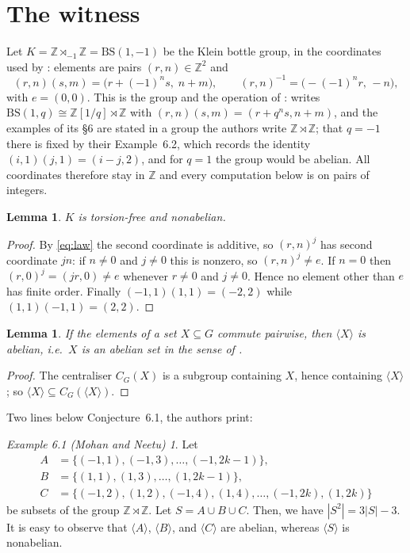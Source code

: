 \documentclass[11pt]{amsart}
\newtheorem{lemma}[theorem]{Lemma}
\theoremstyle{remark}
\newtheorem*{exA}{Example 6.1 (Mohan and Neetu)}
\newcommand{\K}{K}
\begin{document}
\section{The witness}

Let $\K=\mathbb{Z}\rtimes_{-1}\mathbb{Z}=\mathrm{BS}(1,-1)$ be the Klein bottle
group, in the coordinates used by \cite[\S5]{MN}: elements are pairs
$(r,n)\in\mathbb{Z}^{2}$ and
\begin{equation}\label{eq:law}
  (r,n)(s,m)=\bigl(r+(-1)^{n}s,\;n+m\bigr),
  \qquad
  (r,n)^{-1}=\bigl(-(-1)^{n}r,\,-n\bigr),
\end{equation}
with $e=(0,0)$. This is the group and the operation of \cite{MN}:
\cite[\S5]{MN} writes $\mathrm{BS}(1,q)\cong\mathbb{Z}[1/q]\rtimes\mathbb{Z}$
with $(r,n)(s,m)=(r+q^{n}s,n+m)$, and the examples of its \S6 are stated in a
group the authors write $\mathbb{Z}\rtimes\mathbb{Z}$; that $q=-1$ there is
fixed by their Example~6.2, which records the identity $(i,1)(j,1)=(i-j,2)$,
and for $q=1$ the group would be abelian. All coordinates therefore stay in
$\mathbb{Z}$ and every computation below is on pairs of integers.

\begin{lemma}\label{lem:tf}
$\K$ is torsion-free and nonabelian.
\end{lemma}

\begin{proof}
By \eqref{eq:law} the second coordinate is additive, so $(r,n)^{j}$ has second
coordinate $jn$: if $n\ne0$ and $j\ne0$ this is nonzero, so
$(r,n)^{j}\ne e$. If $n=0$ then $(r,0)^{j}=(jr,0)\ne e$ whenever $r\ne0$ and
$j\ne0$. Hence no element other than $e$ has finite order. Finally
$(-1,1)(1,1)=(-2,2)$ while $(1,1)(-1,1)=(2,2)$.
\end{proof}

\begin{lemma}\label{lem:pc}
If the elements of a set $X\subseteq G$ commute pairwise, then $\langle X\rangle$
is abelian, i.e.\ $X$ is an abelian set in the sense of \cite{MN}.
\end{lemma}

\begin{proof}
The centraliser $C_{G}(X)$ is a subgroup containing $X$, hence containing
$\langle X\rangle$; so $\langle X\rangle\subseteq C_{G}(\langle X\rangle)$.
\end{proof}

Two lines below Conjecture~6.1, the authors print:

\begin{exA}
Let
\begin{align*}
  A&=\{(-1,1),(-1,3),\ldots,(-1,2k-1)\},\\
  B&=\{(1,1),(1,3),\ldots,(1,2k-1)\},\\
  C&=\{(-1,2),(1,2),(-1,4),(1,4),\ldots,(-1,2k),(1,2k)\}
\end{align*}
be subsets of the group $\mathbb{Z}\rtimes\mathbb{Z}$. Let $S=A\cup B\cup C$.
Then, we have $|S^{2}|=3|S|-3$. It is easy to observe that $\langle A\rangle$,
$\langle B\rangle$, and $\langle C\rangle$ are abelian, whereas $\langle
S\rangle$ is nonabelian.
\end{exA}
\end{document}
